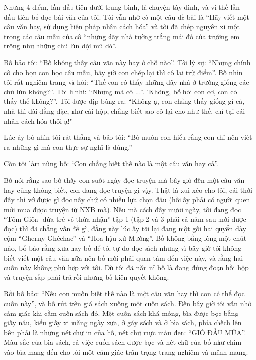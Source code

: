Nhưng 4 điểm, lần đầu tiên dưới trung bình, là chuyện tày đình, và vì thế lần đầu tiên bố đọc bài văn của tôi. Tôi vẫn nhớ có một câu đề bài là “Hãy viết một câu văn hay, sử dụng biện pháp nhân cách hóa” và tôi đã chép nguyên xi một trong các câu mẫu của cô “những dãy nhà tường trắng mái đỏ của trường em trông như những chú lùn đội mũ đỏ”. 

Bố bảo tôi: “Bố không thấy câu văn này hay ở chỗ nào”. Tôi lý sự: “Nhưng chính cô cho bọn con học câu mẫu, bây giờ con chép lại thì cô lại trừ điểm”. Bố nhìn tôi rất nghiêm trang và hỏi: “Thế con có thấy những dãy nhà ở trường giống các chú lùn không?”. Tôi lí nhí: “Nhưng mà cô ...”. "Không, bố hỏi con cơ, con có thấy thế không?”. Tôi được dịp bùng ra: “Không ạ, con chẳng thấy giống gì cả, nhà thì dài dằng dặc, như cái hộp, chẳng biết sao cô lại cho như thế, chỉ tại cái nhân cách hóa thôi ạ!".

Lúc ấy bố nhìn tôi rất thẳng và bảo tôi: “Bố muốn con hiểu rằng con chỉ nên viết ra những gì mà con thực sự nghĩ là đúng.”

Còn tôi làm nũng bố: “Con chẳng biết thế nào là một câu văn hay cả”.  

Bố nói rằng sao bố thấy con suốt ngày đọc truyện mà bây giờ đến một câu văn hay cũng không biết, con đang đọc truyện gì vậy. Thật là xui xẻo cho tôi, cái thời đấy thì vớ được gì đọc nấy chứ có nhiều lựa chọn đâu (hồi ấy phải có người quen mới mua được truyện từ NXB mà). Nếu mà cách đấy mươi ngày, tôi đang đọc “Tôm Giôn- đứa trẻ vô thừa nhận” tập 1 (tập 2 và 3 phải cả năm sau mới được đọc) thì đã chẳng vấn đề gì, đằng này lúc ấy tôi lại đang một gối hai quyển dày cộm “Ghenny Ghéchac” và “Hoa hậu xứ Mường”. Bố không bằng lòng một chút nào, bố bảo rằng xưa nay bố để tôi tự do đọc sách nhưng vì bây giờ tôi không biết viết một câu văn nữa nên bố mới phải quan tâm đến việc này, và rằng hai cuốn này không phù hợp với tôi. Dù tôi đã năn nỉ bố là đang đúng đoạn hồi hộp và truyện sắp phải trả rồi nhưng bố kiên quyết không.

Rồi bố bảo: “Nếu con muốn biết thế nào là một câu văn hay thì con có thể đọc cuốn này”, và bố rút trên giá sách xuống một cuốn sách. Đến bây giờ tôi vẫn nhớ cảm giác khi cầm cuốn sách đó. Một cuốn sách khá mỏng, bìa được bọc bằng giấy nâu, kiểu giấy xi măng ngày xưa, ở gáy sách và ở bìa sách, phía chếch lên bên phải là những nét chữ in của bố, nét chữ mực màu đen: “GIÓ ĐẦU MÙA”. Màu sắc của bìa sách, cả việc cuốn sách được bọc và nét chữ của bố như chìm vào bìa mang đến cho tôi môt cảm giác trân trọng trang nghiêm và mênh mang.

